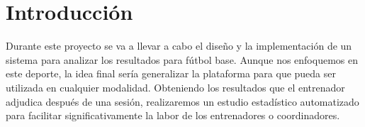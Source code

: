 
\chapter{Introducción}
Durante este proyecto se va a llevar a cabo el diseño y la implementación de un sistema para analizar los resultados para fútbol base. Aunque nos enfoquemos en este deporte, la idea final sería generalizar la plataforma para que pueda ser utilizada en cualquier modalidad. Obteniendo los resultados que el entrenador adjudica después de una sesión, realizaremos un estudio estadístico automatizado para facilitar significativamente la labor de los entrenadores o coordinadores.